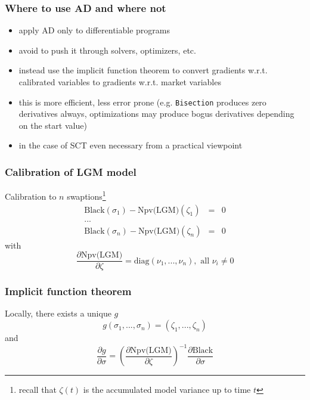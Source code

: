 \documentclass{beamer}
\begin{document}
\begin{frame}[fragile]
\frametitle{Where to use AD and where not}
\begin{itemize}
\item apply AD only to differentiable programs
\item avoid to push it through solvers, optimizers, etc.
\item instead use the implicit function theorem to convert gradients w.r.t. calibrated variables to gradients w.r.t. market variables
\item this is more efficient, less error prone (e.g. \verb+Bisection+ produces zero derivatives always, optimizations may produce bogus derivatives depending on the start value)
\item in the case of SCT even necessary from a practical viewpoint
\end{itemize}
\end{frame}

\begin{frame}[fragile]
\frametitle{Calibration of LGM model}
Calibration to $n$ swaptions\footnote{recall that $\zeta(t)$ is the accumulated model variance up to time $t$}
\begin{eqnarray*}
\text{Black}(\sigma_1) - \text{Npv(LGM)}(\zeta_1) &=& 0 \\
... \\
\text{Black}(\sigma_n) - \text{Npv(LGM)}(\zeta_n) &=& 0
\end{eqnarray*}
with
\begin{equation}
\frac{\partial \text{Npv(LGM)}}{\partial \zeta} = \text{diag}(\nu_1, ..., \nu_n), \text{ all } \nu_i \neq 0
\end{equation}
\end{frame}

\begin{frame}[fragile]
\frametitle{Implicit function theorem}
Locally, there exists a unique $g$
\begin{equation}
g(\sigma_1, ... , \sigma_n) = (\zeta_1, ..., \zeta_n)
\end{equation}
and
\begin{equation}
\frac{\partial g}{\partial \sigma} = \left( \frac{\partial \text{Npv(LGM)}}{\partial \zeta} \right) ^ {-1} \frac{\partial \text{Black}}{\partial \sigma}
\end{equation}
\end{frame}
\end{document}
